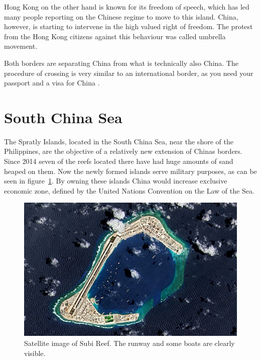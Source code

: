 \documentclass[conference]{IEEEtran}
\begin{document}
	Hong Kong on the other hand is known for its freedom of speech, which has led many people reporting on the Chinese regime to move to this island. China, however, is starting to intervene in the high valued right of freedom. The protest from the Hong Kong citizens against this behaviour was called umbrella movement.
	
	Both borders are separating China from what is technically also China. The procedure of crossing is very similar to an international border, as you need your passport and a visa for China\cite{macauLifestyle_macauZhuhaiTheUltimateBorderCrossingGuide} \cite{yp_chinaIsErasingItsBorderWithHongKong}.
	
	\section{South China Sea}
	The Spratly Islands, located in the South China Sea, near the shore of the Philippines, are the objective of a relatively new extension of Chinas borders. Since 2014 seven of the reefs located there have had huge amounts of sand heaped on them. Now the newly formed islands serve military purposes, as can be seen in figure~\ref{pic:southChinaSea_subiReef}. By owning these islands China would increase exclusive economic zone, defined by the United Nations Convention on the Law of the Sea\cite{unitedNations_lawOfTheSea}.
	
	\begin{figure}[t]
		\centering
		\includegraphics[width=\linewidth]{img/southChinaSea_subiReef.jpg}
		\caption{Satellite image of Subi Reef\cite{theTelegraph_chinaLandsMilitaryPlaneAtThirdSpratlyIsland}. The runway and some boats are clearly visible.}
		\label{pic:southChinaSea_subiReef}
	\end{figure}
	
\end{document}
